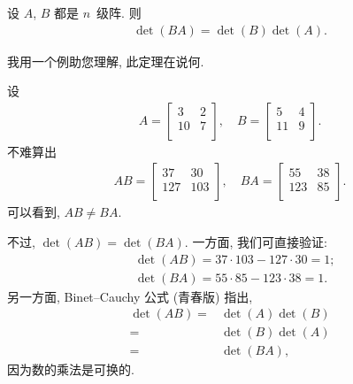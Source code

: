 \documentclass[../libro.tex]{subfiles}
\begin{document}
\begin{theorem}
    设 \(A\), \(B\) 都是 \(n\)~级阵.
    则
    \begin{align*}
        \det {(BA)} = \det {(B)} \det {(A)}.
    \end{align*}
\end{theorem}

我用一个例助您理解, 此定理在说何.

\begin{example}
    设
    \begin{align*}
        A =
        \begin{bmatrix}
            3  & 2 \\
            10 & 7 \\
        \end{bmatrix},
        \quad
        B =
        \begin{bmatrix}
            5  & 4 \\
            11 & 9 \\
        \end{bmatrix}.
    \end{align*}
    不难算出
    \begin{align*}
        AB =
        \begin{bmatrix}
            37  & 30  \\
            127 & 103 \\
        \end{bmatrix},
        \quad
        BA =
        \begin{bmatrix}
            55  & 38 \\
            123 & 85 \\
        \end{bmatrix}.
    \end{align*}
    可以看到, \(AB \neq BA\).

    不过, \(\det {(AB)} = \det {(BA)}\).
    一方面, 我们可直接验证:
    \begin{align*}
        & \det {(AB)} = 37 \cdot 103 - 127 \cdot 30 = 1; \\
        & \det {(BA)} = 55 \cdot 85 - 123 \cdot 38 = 1.
    \end{align*}
    另一方面, Binet--Cauchy 公式 (青春版) 指出,
    \begin{align*}
        \det {(AB)}
        = {} & \det {(A)} \det {(B)} \\
        = {} & \det {(B)} \det {(A)} \\
        = {} & \det {(BA)},
    \end{align*}
    因为数的乘法是可换的.
\end{example}
\end{document}
